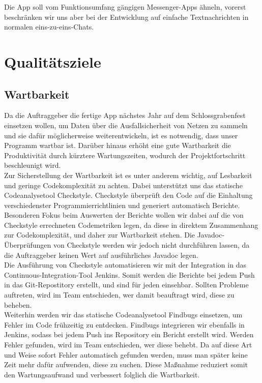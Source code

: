 \documentclass[accentcolor=tud0b,12pt,paper=a4]{tudreport}
\begin{document}
		Die App soll vom Funktionsumfang gängigen Messenger-Apps ähneln, vorerst beschränken wir uns aber bei der Entwicklung auf einfache Textnachrichten in normalen eins-zu-eins-Chats.\\

	\chapter{Qualitätsziele}
        \section{Wartbarkeit}
    
		Da die Auftraggeber die fertige App nächstes Jahr auf dem Schlossgrabenfest einsetzen wollen, um Daten über die Ausfallsicherheit von Netzen zu sammeln und sie dafür möglicherweise weiterentwickeln, ist es notwendig, dass unser Programm wartbar ist. Darüber hinaus erhöht eine gute Wartbarkeit die Produktivität durch kürztere Wartungszeiten, wodurch der Projektfortschritt beschleunigt wird.\\

                Zur Sicherstellung der Wartbarkeit ist es unter anderem wichtig, auf Lesbarkeit und geringe Codekomplexität zu achten. Dabei unterstützt uns das statische Codeanalysetool Checkstyle. Checkstyle überprüft den Code auf die Einhaltung verschiedenster Programmierrichtlinien und generiert automatisch Berichte. Besonderen Fokus beim Auswerten der Berichte wollen wir dabei auf die von Checkstyle errechneten Codemetriken legen, da diese in direktem Zusammenhang zur Codekomplexität, und daher zur Wartbarkeit stehen. Die Javadoc-Überprüfungen von Checkstyle werden wir jedoch nicht durchführen lassen, da die Auftraggeber keinen Wert auf ausführliches Javadoc legen.\\

                Die Ausführung von Checkstyle automatisieren wir mit der Integration in das Continuous-Integration-Tool Jenkins. Somit werden die Berichte bei jedem Push in das Git-Repostitory erstellt, und sind für jeden einsehbar. Sollten Probleme auftreten, wird im Team entschieden, wer damit beauftragt wird, diese zu beheben.\\

                Weiterhin werden wir das statische Codeanalysetool Findbugs einsetzen, um Fehler im Code frühzeitig zu entdecken. Findbugs integrieren wir ebenfalls in Jenkins, sodass bei jedem Push ins Repository ein Bericht erstellt wird. Werden Fehler gefunden, wird im Team entschieden, wer diese behebt. Da auf diese Art und Weise sofort Fehler automatisch gefunden werden, muss man später keine Zeit mehr dafür aufwenden, diese zu suchen. Diese Maßnahme reduziert somit den Wartungsaufwand und verbessert folglich die Wartbarkeit.\\
\end{document}
